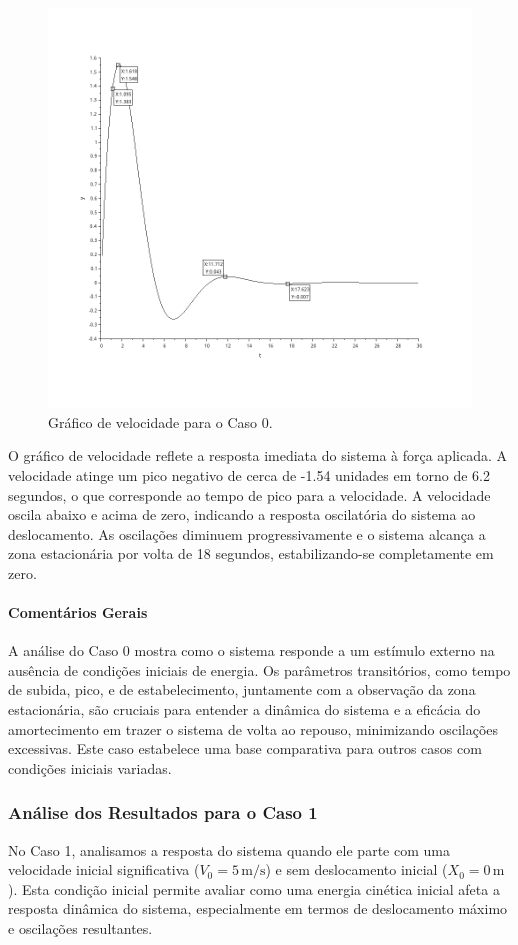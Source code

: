 \begin{figure}[H]
    \centering
    \includegraphics[height=0.7\textwidth]{atividades/2-atividade/assets/velocidade-caso-0.png}
    \caption{Gráfico de velocidade para o Caso 0.}
\end{figure}
O gráfico de velocidade reflete a resposta imediata do sistema à força aplicada. A velocidade atinge um pico negativo de cerca de -1.54 unidades em torno de 6.2 segundos, o que corresponde ao tempo de pico para a velocidade. A velocidade oscila abaixo e acima de zero, indicando a resposta oscilatória do sistema ao deslocamento. As oscilações diminuem progressivamente e o sistema alcança a zona estacionária por volta de 18 segundos, estabilizando-se completamente em zero.

\paragraph{Comentários Gerais}
A análise do Caso 0 mostra como o sistema responde a um estímulo externo na ausência de condições iniciais de energia. Os parâmetros transitórios, como tempo de subida, pico, e de estabelecimento, juntamente com a observação da zona estacionária, são cruciais para entender a dinâmica do sistema e a eficácia do amortecimento em trazer o sistema de volta ao repouso, minimizando oscilações excessivas. Este caso estabelece uma base comparativa para outros casos com condições iniciais variadas.


\subsubsection{Análise dos Resultados para o Caso 1}
No Caso 1, analisamos a resposta do sistema quando ele parte com uma velocidade inicial significativa (\(V_0 = 5 \, \text{m/s}\)) e sem deslocamento inicial (\(X_0 = 0 \, \text{m}\)). Esta condição inicial permite avaliar como uma energia cinética inicial afeta a resposta dinâmica do sistema, especialmente em termos de deslocamento máximo e oscilações resultantes.


